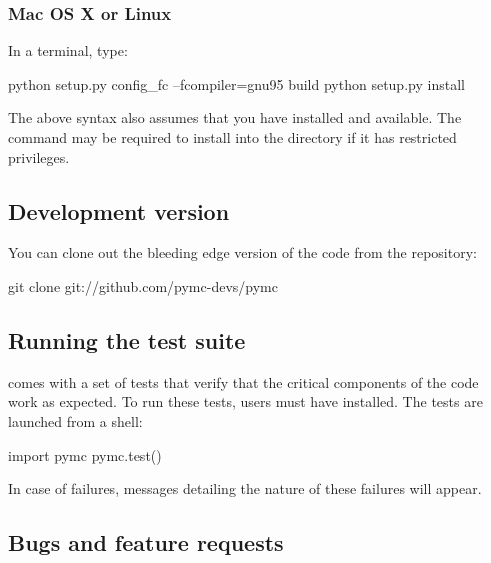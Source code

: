 \documentclass[]{jss}
\begin{document}
\subsubsection{Mac OS X or Linux}
  \label{mac-os-x-or-linux}%


In a terminal, type:
\begin{CodeInput}
python setup.py config_fc --fcompiler=gnu95 build
python setup.py install
\end{CodeInput}

The above syntax also assumes that you have  installed and available. The
 command may be required to install  into the  
directory if it has restricted privileges.



\subsection{Development version}
  \label{development-version}%


You can clone out the bleeding edge version of the code from the  \citep{git} 
repository:
\begin{CodeInput}
git clone git://github.com/pymc-devs/pymc
\end{CodeInput}



\subsection{Running the test suite}
  \label{running-the-test-suite}%


  comes with a set of tests that verify that the critical components
of the code work as expected. To run these tests, users must have 
installed. The tests are launched from a  shell:
\begin{CodeInput}
import pymc
pymc.test()
\end{CodeInput}

In case of failures, messages detailing the nature of these failures will
appear.



\subsection{Bugs and feature requests}
  \label{bugs-and-feature-requests}%
\end{document}
